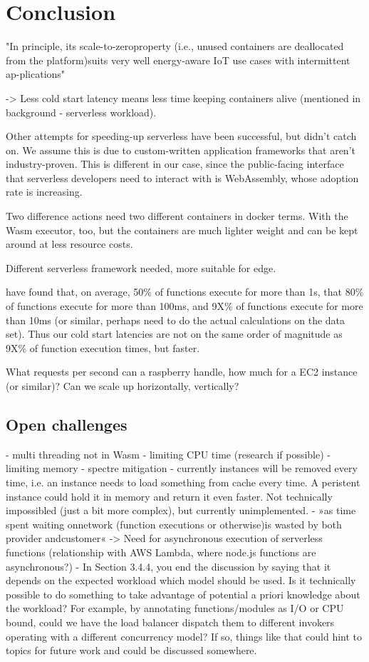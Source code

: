 \chapter{Conclusion}
\label{chapter:conclusion}

"In principle, its scale-to-zeroproperty (i.e., unused containers are deallocated from the platform)suits very well energy-aware IoT use cases with intermittent ap-plications" \cite{Aslanpour2021}

-> Less cold start latency means less time keeping containers alive (mentioned in background - serverless workload).

Other attempts for speeding-up serverless have been successful, but didn't catch on. We assume this is due to custom-written application frameworks that aren't industry-proven. This is different in our case, since the public-facing interface that serverless developers need to interact with is WebAssembly, whose adoption rate is increasing.

Two difference actions need two different containers in docker terms. With the Wasm executor, too, but the containers are much lighter weight and can be kept around at less resource costs.

Different serverless framework needed, more suitable for edge.

\citeauthor{Shahrad2020} have found that, on average, 50\% of functions execute for more than 1s, that 80\% of functions execute for more than 100ms, and 9X\% of functions execute for more than 10ms (or similar, perhaps need to do the actual calculations on the data set). Thus our cold start latencies are not on the same order of magnitude as 9X\% of function execution times, but faster.

What requests per second can a raspberry handle, how much for a EC2 instance (or similar)? Can we scale up horizontally, vertically?

\section{Open challenges}

- multi threading not in Wasm
- limiting CPU time (research if possible)
- limiting memory
- spectre mitigation
- currently instances will be removed every time, i.e. an instance needs to load something from cache every time. A peristent instance could hold it in memory and return it even faster. Not technically impossibled (just a bit more complex), but currently unimplemented.
- »as ​​time ​​spent ​​waiting on ​​network ​​(function ​​executions ​​or ​​otherwise)is ​​wasted ​​by ​​both ​​provider ​and ​customer« \citeauthor{Fox2017} -> Need for asynchronous execution of serverless functions (relationship with AWS Lambda, where node.js functions are asynchronous?)
- In Section 3.4.4, you end the discussion by saying that it depends on the expected workload which model should be used. Is it technically possible to do something to take advantage of potential a priori knowledge about the workload? For example, by annotating functions/modules as I/O or CPU bound, could we have the load balancer dispatch them to different invokers operating with a different concurrency model? If so, things like that could hint to topics for future work and could be discussed somewhere. 
